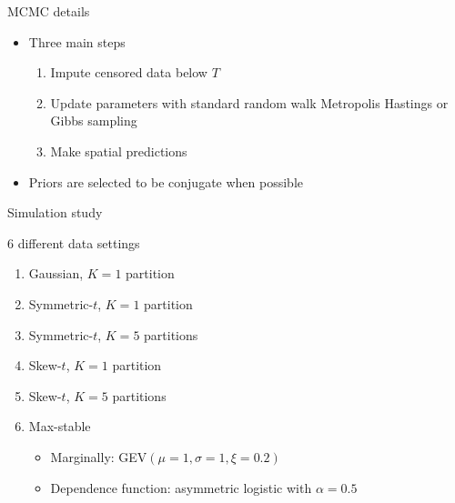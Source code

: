 \documentclass{beamer}
\begin{document}



\begin{frame}{MCMC details}
  \begin{itemize} \setlength{\itemsep}{1em}
    \item Three main steps \vspace{0.5em}
    \begin{enumerate}[1.] \setlength{\itemsep}{0.5em}
      \item Impute censored data below $T$
      \item Update parameters with standard random walk Metropolis Hastings or Gibbs sampling
      \item Make spatial predictions
    \end{enumerate}
    \item Priors are selected to be conjugate when possible
  \end{itemize}
\end{frame}

\begin{frame}{Simulation study}
\begin{adjustwidth}{1em}{0em}
  6 different data settings \vspace{0.5em}
  \begin{enumerate}[1.] \setlength{\itemsep}{0.5em}
    \item Gaussian, $K = 1$ partition
    \item Symmetric-$t$, $K = 1$ partition
    \item Symmetric-$t$, $K = 5$ partitions
    \item Skew-$t$, $K = 1$ partition
    \item Skew-$t$, $K = 5$ partitions
    \item Max-stable \vspace{0.25em}
    \begin{itemize} \setlength{\itemsep}{0.25em}
      \item Marginally: GEV$(\mu=1, \sigma=1, \xi=0.2)$
      \item Dependence function: asymmetric logistic with $\alpha = 0.5$
    \end{itemize}
  \end{enumerate}
\end{adjustwidth}
\end{frame}
\end{document}
